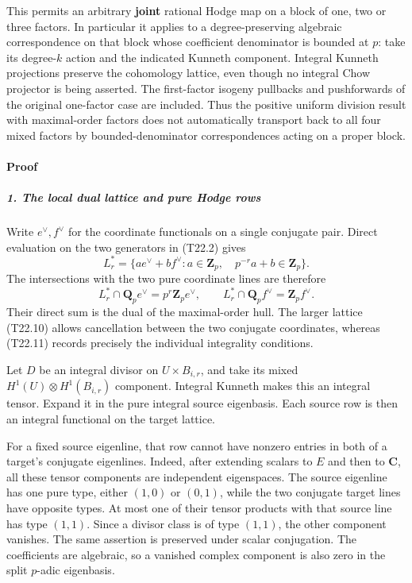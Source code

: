 \documentclass[11pt,a4paper]{article}
\theoremstyle{definition}
\begin{document}
This permits an arbitrary \textbf{joint} rational Hodge map on a block of one, two or three factors. In particular it applies to a degree-preserving algebraic correspondence on that block whose coefficient denominator is bounded at \(p\): take its degree-\(k\) action and the indicated Kunneth component. Integral Kunneth projections preserve the cohomology lattice, even though no integral Chow projector is being asserted. The first-factor isogeny pullbacks and pushforwards of the original one-factor case are included. Thus the positive uniform division result with maximal-order factors does not automatically transport back to all four mixed factors by bounded-denominator correspondences acting on a proper block.

\paragraph{Proof}\label{proof-3}

\subparagraph{1. The local dual lattice and pure Hodge rows}\label{the-local-dual-lattice-and-pure-hodge-rows}

Write \(e^\vee,f^\vee\) for the coordinate functionals on a single conjugate pair. Direct evaluation on the two generators in (T22.2) gives \[
 L_r^*=
 \{a e^\vee+b f^\vee:
       a\in\mathbf Z_p,\quad p^{-r}a+b\in\mathbf Z_p\}.
 \tag{T22.10}
\] The intersections with the two pure coordinate lines are therefore \[
 L_r^*\cap\mathbf Q_p e^\vee=p^r\mathbf Z_p e^\vee,
 \qquad
 L_r^*\cap\mathbf Q_p f^\vee=\mathbf Z_p f^\vee.
 \tag{T22.11}
\] Their direct sum is the dual of the maximal-order hull. The larger lattice (T22.10) allows cancellation between the two conjugate coordinates, whereas (T22.11) records precisely the individual integrality conditions.

Let \(D\) be an integral divisor on \(U\times B_{i,r}\), and take its mixed \(H^1(U)\otimes H^1(B_{i,r})\) component. Integral Kunneth makes this an integral tensor. Expand it in the pure integral source eigenbasis. Each source row is then an integral functional on the target lattice.

For a fixed source eigenline, that row cannot have nonzero entries in both of a target's conjugate eigenlines. Indeed, after extending scalars to \(E\) and then to \(\mathbf C\), all these tensor components are independent eigenspaces. The source eigenline has one pure type, either \((1,0)\) or \((0,1)\), while the two conjugate target lines have opposite types. At most one of their tensor products with that source line has type \((1,1)\). Since a divisor class is of type \((1,1)\), the other component vanishes. The same assertion is preserved under scalar conjugation. The coefficients are algebraic, so a vanished complex component is also zero in the split \(p\)-adic eigenbasis.
\end{document}
